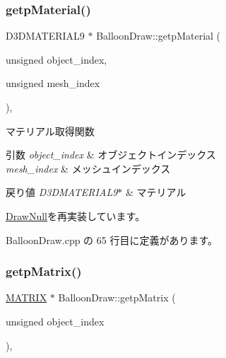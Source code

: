 \subsubsection{\texorpdfstring{getp\+Material()}{getpMaterial()}}
{\footnotesize\ttfamily D3\+D\+M\+A\+T\+E\+R\+I\+A\+L9 $\ast$ Balloon\+Draw\+::getp\+Material (\begin{DoxyParamCaption}\item[{unsigned}]{object\+\_\+index,  }\item[{unsigned}]{mesh\+\_\+index }\end{DoxyParamCaption})\hspace{0.3cm}{\ttfamily [override]}, {\ttfamily [virtual]}}



マテリアル取得関数 


\begin{DoxyParams}{引数}
{\em object\+\_\+index} & オブジェクトインデックス \\
\hline
{\em mesh\+\_\+index} & メッシュインデックス \\
\hline
\end{DoxyParams}

\begin{DoxyRetVals}{戻り値}
{\em D3\+D\+M\+A\+T\+E\+R\+I\+A\+L9$\ast$} & マテリアル \\
\hline
\end{DoxyRetVals}


\mbox{\hyperlink{class_draw_null_a0c1efe55fea325ad277594be6fe1e938}{Draw\+Null}}を再実装しています。



 Balloon\+Draw.\+cpp の 65 行目に定義があります。

\mbox{\label{class_balloon_draw_ab98a9333dcdf57c0ede287444b7cbabb}} 
\subsubsection{\texorpdfstring{getp\+Matrix()}{getpMatrix()}}
{\footnotesize\ttfamily \mbox{\hyperlink{_matrix_8h_a032295cd9fb1b711757c90667278e744}{M\+A\+T\+R\+IX}} $\ast$ Balloon\+Draw\+::getp\+Matrix (\begin{DoxyParamCaption}\item[{unsigned}]{object\+\_\+index }\end{DoxyParamCaption})\hspace{0.3cm}{\ttfamily [override]}, {\ttfamily [virtual]}}



